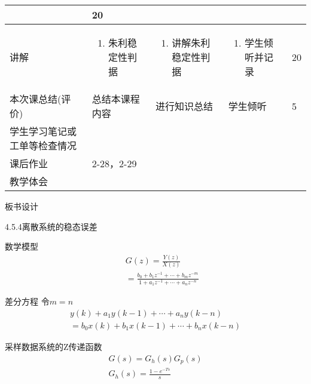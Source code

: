{\begin{landscape}
\begin{longtable}{|m{10mm}|m{50mm}|m{50mm}|m{50mm}|m{15mm}|}
\begin{enumerate}
\end{enumerate} &20 \\\hline
讲解&\begin{enumerate}
\item 朱利稳定性判据
\end{enumerate}
&\begin{enumerate}
\item 讲解朱利稳定性判据
\end{enumerate} &\begin{enumerate}
\item 学生倾听并记录
\end{enumerate} &20 \\\hline
\centering 本次课总结(评价)&总结本课程内容 &进行知识总结 &学生倾听 &5 \\\hline
\centering 学生学习笔记或工单等检查情况&\multicolumn{4}{m{165mm}|}{\quad}\\\hline
\centering 课后作业&\multicolumn{4}{m{165mm}|}{2-28，2-29}\\\hline
\centering 教学体会&\multicolumn{4}{m{165mm}|}{\quad}\\
\end{longtable}

\end{landscape}
\clearpage
\begin{center}
{\huge 板书设计}
\end{center}
}

 \begin{frame}{4.5.4离散系统的稳态误差} 
 \begin{block}{数学模型}
 \begin{eqnarray*}
&& G(z)=\frac{Y(z)}{X(z)}\\
 &&=\frac{b_0+b_1z^{-1}+\cdots +b_mz^{-m}}{1+a_1z^{-1}+\cdots +a_nz^{-n}}
 \end{eqnarray*}
 \end{block}
 \end{frame}
 
 \begin{frame}
 \begin{block}{差分方程}
 令$m=n$
\begin{eqnarray*}
y(k)+a_1y(k-1)+\cdots +a_ny(k-n)\\
=b_0x(k)+b_1x(k-1)+\cdots +b_nx(k-n)
\end{eqnarray*}
\end{block}
\begin{block}{采样数据系统的Z传递函数}
\begin{eqnarray*}
G(s)=G_h(s)G_p(s)\\
G_h(s)=\frac{1-e^{-Ts}}{s}
\end{eqnarray*}
\end{block}
\end{frame}


